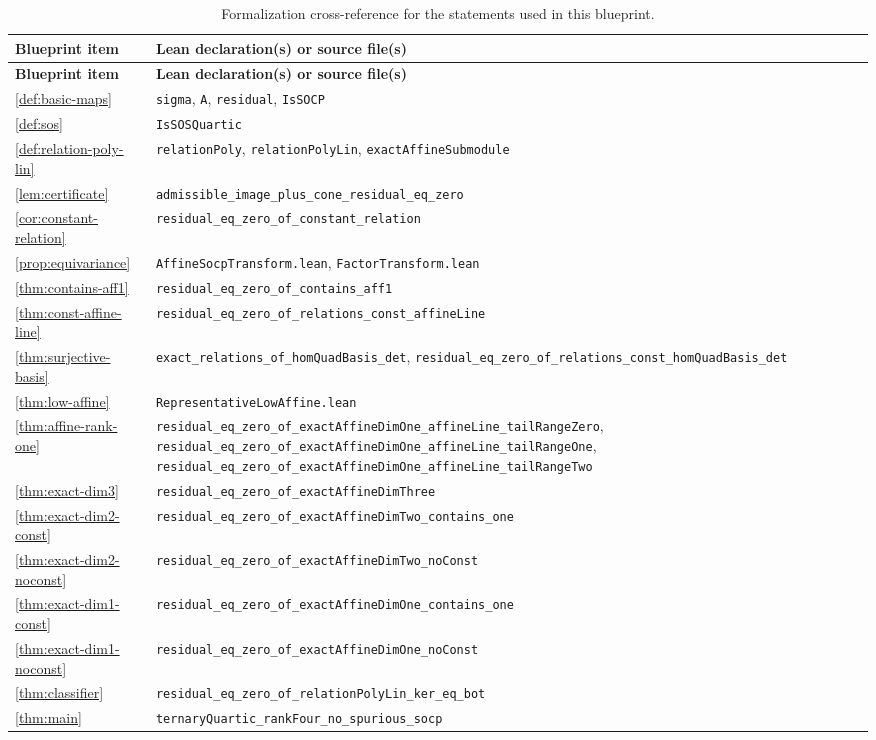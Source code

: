 \documentclass[10pt]{article}
\theoremstyle{definition}
\newcommand{\lean}[1]{\nolinkurl{#1}}
\begin{document}
\setlength{\LTleft}{0pt}
\setlength{\LTright}{0pt}
\small
\begin{longtable}{L{0.27\textwidth}L{0.63\textwidth}}
\caption{Formalization cross-reference for the statements used in this blueprint.}
\label{tab:lean-xref}\\
\textbf{Blueprint item} & \textbf{Lean declaration(s) or source file(s)}\\
\hline
\endfirsthead
\textbf{Blueprint item} & \textbf{Lean declaration(s) or source file(s)}\\
\hline
\endhead
\cref{def:basic-maps} &
\lean{sigma}, \lean{A}, \lean{residual}, \lean{IsSOCP}\\
\cref{def:sos} &
\lean{IsSOSQuartic}\\
\cref{def:relation-poly-lin} &
\lean{relationPoly}, \lean{relationPolyLin}, \lean{exactAffineSubmodule}\\
\cref{lem:certificate} &
\lean{admissible_image_plus_cone_residual_eq_zero}\\
\cref{cor:constant-relation} &
\lean{residual_eq_zero_of_constant_relation}\\
\cref{prop:equivariance} &
\lean{AffineSocpTransform.lean}, \lean{FactorTransform.lean}\\
\cref{thm:contains-aff1} &
\lean{residual_eq_zero_of_contains_aff1}\\
\cref{thm:const-affine-line} &
\lean{residual_eq_zero_of_relations_const_affineLine}\\
\cref{thm:surjective-basis} &
\lean{exact_relations_of_homQuadBasis_det},
\lean{residual_eq_zero_of_relations_const_homQuadBasis_det}\\
\cref{thm:low-affine} &
\lean{RepresentativeLowAffine.lean}\\
\cref{thm:affine-rank-one} &
\lean{residual_eq_zero_of_exactAffineDimOne_affineLine_tailRangeZero},
\lean{residual_eq_zero_of_exactAffineDimOne_affineLine_tailRangeOne},
\lean{residual_eq_zero_of_exactAffineDimOne_affineLine_tailRangeTwo}\\
\cref{thm:exact-dim3} &
\lean{residual_eq_zero_of_exactAffineDimThree}\\
\cref{thm:exact-dim2-const} &
\lean{residual_eq_zero_of_exactAffineDimTwo_contains_one}\\
\cref{thm:exact-dim2-noconst} &
\lean{residual_eq_zero_of_exactAffineDimTwo_noConst}\\
\cref{thm:exact-dim1-const} &
\lean{residual_eq_zero_of_exactAffineDimOne_contains_one}\\
\cref{thm:exact-dim1-noconst} &
\lean{residual_eq_zero_of_exactAffineDimOne_noConst}\\
\cref{thm:classifier} &
\lean{residual_eq_zero_of_relationPolyLin_ker_eq_bot}\\
\cref{thm:main} &
\lean{ternaryQuartic_rankFour_no_spurious_socp}\\
\end{longtable}
\normalsize
\end{document}
